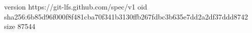 version https://git-lfs.github.com/spec/v1
oid sha256:6b85d96f000f8f481cba70f341b3130ffb267fdbc3b635e7dd2a2df37ddd8742
size 87544
